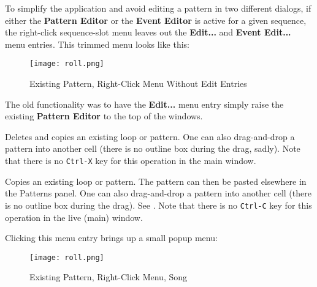    To simplify the application and avoid editing a pattern in
   two different dialogs, if either the 
   \textbf{Pattern Editor} or the
   \textbf{Event Editor} is
   active for a given sequence, the right-click sequence-slot menu leaves out
   the \textbf{Edit...} and \textbf{Event Edit...} menu entries.
   This trimmed menu looks like this:

\begin{figure}[H]
   \centering 
   \texttt{[image: roll.png]}
   \caption{Existing Pattern, Right-Click Menu Without Edit Entries}
   \label{fig:pattern_window_right_click_no_edit}
\end{figure}

   The old functionality was to have the \textbf{Edit...} menu entry simply
   raise the existing 
   \textbf{Pattern Editor} to the top of the windows.

   Deletes and copies an existing loop or pattern.
   One can also drag-and-drop a pattern into another cell (there is no outline
   box during the drag, sadly).
   Note that there is no \texttt{Ctrl-X} key for this operation in the
   main window.

%

   Copies an existing loop or pattern.
   The pattern can then be pasted elsewhere in the Patterns panel.
   One can also drag-and-drop a pattern into another cell (there is no outline
   box during the drag).
   See .
   Note that there is no \texttt{Ctrl-C} key for this operation in the
   live (main) window.

   Clicking this menu entry brings up a small popup menu:

\begin{figure}[H]
   \centering 
   \texttt{[image: roll.png]}
   \caption{Existing Pattern, Right-Click Menu, Song}
   \label{fig:pattern_window_right_click_song}
\end{figure}

